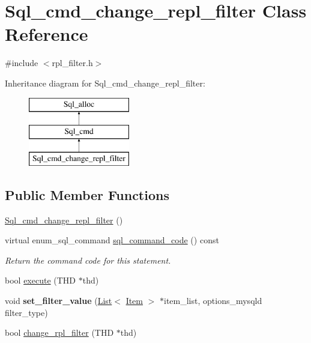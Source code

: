 \hypertarget{classSql__cmd__change__repl__filter}{}\section{Sql\+\_\+cmd\+\_\+change\+\_\+repl\+\_\+filter Class Reference}
\label{classSql__cmd__change__repl__filter}


{\ttfamily \#include $<$rpl\+\_\+filter.\+h$>$}

Inheritance diagram for Sql\+\_\+cmd\+\_\+change\+\_\+repl\+\_\+filter\+:\begin{figure}[H]
\begin{center}
\leavevmode
\includegraphics[height=3.000000cm]{classSql__cmd__change__repl__filter}
\end{center}
\end{figure}
\subsection*{Public Member Functions}
\begin{DoxyCompactItemize}
\item 
\mbox{\hyperlink{classSql__cmd__change__repl__filter_a73611ab571310908fc2af65d573f55a0}{Sql\+\_\+cmd\+\_\+change\+\_\+repl\+\_\+filter}} ()
\item 
\mbox{\label{classSql__cmd__change__repl__filter_a31e9001f1040b16104601ba7baacdb5c}} 
virtual enum\+\_\+sql\+\_\+command \mbox{\hyperlink{classSql__cmd__change__repl__filter_a31e9001f1040b16104601ba7baacdb5c}{sql\+\_\+command\+\_\+code}} () const
\begin{DoxyCompactList}\small\item\em Return the command code for this statement. \end{DoxyCompactList}\item 
bool \mbox{\hyperlink{classSql__cmd__change__repl__filter_ad07a5ae16f5018f6235ea978e523a6df}{execute}} (T\+HD $\ast$thd)
\item 
\mbox{\label{classSql__cmd__change__repl__filter_a35ec8f44b50b6c3489f209ffee94b091}} 
void {\bfseries set\+\_\+filter\+\_\+value} (\mbox{\hyperlink{classList}{List}}$<$ \mbox{\hyperlink{classItem}{Item}} $>$ $\ast$item\+\_\+list, options\+\_\+mysqld filter\+\_\+type)
\item 
bool \mbox{\hyperlink{classSql__cmd__change__repl__filter_a978000a3c38f87c64f62c736d8f36012}{change\+\_\+rpl\+\_\+filter}} (T\+HD $\ast$thd)
\end{DoxyCompactItemize}
